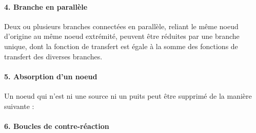 \paragraph{4. Branche en parallèle}
Deux ou plusieurs branches connectées en parallèle, reliant le même noeud d'origine au même 
noeud extrémité, peuvent être réduites par une branche unique, dont la fonction de transfert 
est égale à la somme des fonctions de transfert des diverses branches. 

\begin{center}
\end{center}

\paragraph{5. Absorption d'un noeud}
Un noeud qui n'est ni une source ni un puits peut être supprimé de la manière suivante :

\begin{center}
\end{center}

\paragraph{6. Boucles de contre-réaction}

